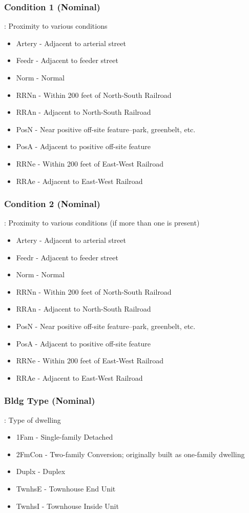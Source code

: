 \documentclass[sigconf]{acmart}
\begin{document}
	\subsubsection{Condition 1 (Nominal)}: Proximity to various conditions
	\begin{itemize}
		\item  Artery - Adjacent to arterial street
		\item  Feedr - Adjacent to feeder street
		\item  Norm - Normal
		\item  RRNn - Within 200 feet of North-South Railroad
		\item  RRAn - Adjacent to North-South Railroad
		\item  PosN - Near positive off-site feature--park, greenbelt, etc.
		\item  PosA - Adjacent to positive off-site feature
		\item  RRNe - Within 200 feet of East-West Railroad
		\item  RRAe - Adjacent to East-West Railroad
	\end{itemize}
	\subsubsection{Condition 2 (Nominal)}: Proximity to various conditions (if more than one is present)
	\begin{itemize}
		\item  Artery - Adjacent to arterial street
		\item  Feedr - Adjacent to feeder street
		\item  Norm - Normal
		\item  RRNn - Within 200 feet of North-South Railroad
		\item  RRAn - Adjacent to North-South Railroad
		\item  PosN - Near positive off-site feature--park, greenbelt, etc.
		\item  PosA - Adjacent to positive off-site feature
		\item  RRNe - Within 200 feet of East-West Railroad
		\item  RRAe - Adjacent to East-West Railroad
	\end{itemize}
	
	\subsubsection{Bldg Type (Nominal)}: Type of dwelling
	\begin{itemize}
		\item  1Fam - Single-family Detached
		\item  2FmCon - Two-family Conversion; originally built as one-family dwelling
		\item  Duplx - Duplex
		\item  TwnhsE - Townhouse End Unit
		\item  TwnhsI - Townhouse Inside Unit
	\end{itemize}
	
\end{document}
